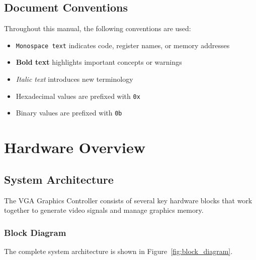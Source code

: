 \documentclass[11pt,letterpaper]{report}
\begin{document}
\section{Document Conventions}

Throughout this manual, the following conventions are used:

\begin{itemize}
    \item \texttt{Monospace text} indicates code, register names, or memory addresses
    \item \textbf{Bold text} highlights important concepts or warnings
    \item \textit{Italic text} introduces new terminology
    \item Hexadecimal values are prefixed with \texttt{0x}
    \item Binary values are prefixed with \texttt{0b}
\end{itemize}

\chapter{Hardware Overview}

\section{System Architecture}

The VGA Graphics Controller consists of several key hardware blocks that work together to generate video signals and manage graphics memory.

\subsection{Block Diagram}

The complete system architecture is shown in Figure~\ref{fig:block_diagram}.
\end{document}
